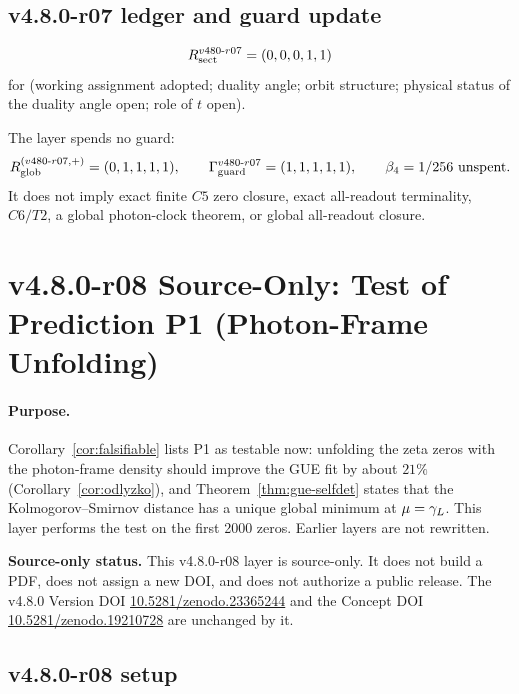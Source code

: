 \subsection*{v4.8.0-r07 ledger and guard update}
\label{subsec:v480-r07-ledger-guard}

\[
R_{\rm sect}^{v480\text{-}r07}=(0,0,0,1,1)
\]
for (working assignment adopted; duality angle; orbit structure; physical status of the duality angle
open; role of \(t\) open).

The layer spends no guard:
\[
R_{\rm glob}^{(v480\text{-}r07,+)}=(0,1,1,1,1),
\qquad
\Gamma_{\rm guard}^{v480\text{-}r07}=(1,1,1,1,1),
\qquad
\beta_4=1/256\ \text{unspent}.
\]
It does not imply exact finite \(C5\) zero closure, exact all-readout terminality,
\(C6/T2\), a global photon-clock theorem, or global all-readout closure.


\clearpage
\section*{v4.8.0-r08 Source-Only: Test of Prediction P1 (Photon-Frame Unfolding)}
\label{sec:v480-r08-p1-test}

\paragraph{Purpose.}
Corollary~\ref{cor:falsifiable} lists P1 as testable now: unfolding the zeta zeros with the
photon-frame density should improve the GUE fit by about \(21\%\) (Corollary~\ref{cor:odlyzko}),
and Theorem~\ref{thm:gue-selfdet} states that the Kolmogorov--Smirnov distance has a unique global
minimum at \(\mu=\gamma_L\).  This layer performs the test on the first 2000 zeros.  Earlier layers are
not rewritten.

\noindent\textbf{Source-only status.}
This v4.8.0-r08 layer is source-only.  It does not build a PDF, does not assign a new DOI,
and does not authorize a public release.  The v4.8.0 Version DOI
\href{https://doi.org/10.5281/zenodo.23365244}{10.5281/zenodo.23365244} and the Concept DOI
\href{https://doi.org/10.5281/zenodo.19210728}{10.5281/zenodo.19210728} are unchanged by it.

\subsection*{v4.8.0-r08 setup}
\label{subsec:v480-r08-setup}


